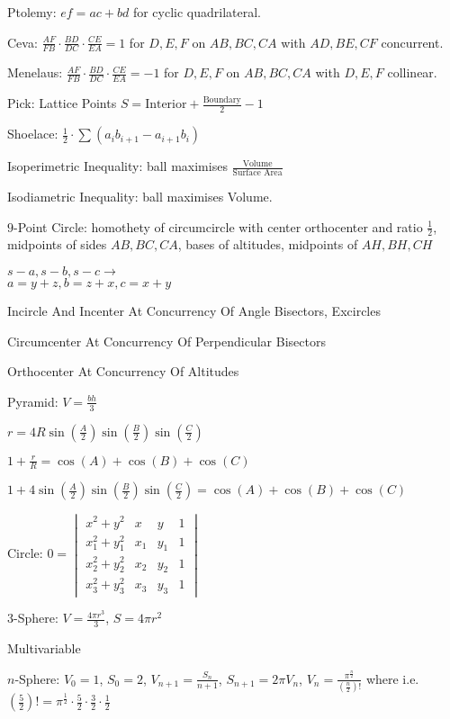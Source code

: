 Ptolemy: $ef=ac+bd$ for cyclic quadrilateral.

Ceva: $\frac{AF}{FB} \cdot \frac{BD}{DC} \cdot \frac{CE}{EA} = 1$ for $D,E,F$ on $AB,BC,CA$ with $AD,BE,CF$ concurrent.

Menelaus: $\frac{AF}{FB} \cdot \frac{BD}{DC} \cdot \frac{CE}{EA} = -1$ for $D,E,F$ on $AB,BC,CA$ with $D,E,F$ collinear.

Pick: Lattice Points $S=\text{Interior}+\frac{\text{Boundary}}{2}-1$

Shoelace: $\frac{1}{2} \cdot \sum (a_i b_{i+1} - a_{i+1} b_i)$

Isoperimetric Inequality: ball maximises $\frac{\text{Volume}}{\text{Surface Area}}$

Isodiametric Inequality: ball maximises Volume.

$9$-Point Circle: homothety of circumcircle with center orthocenter and ratio $\frac{1}{2}$, midpoints of sides $AB,BC,CA$, bases of altitudes, midpoints of $AH,BH,CH$

$s-a,s-b,s-c \to$ \\
$a=y+z,b=z+x,c=x+y$

Incircle And Incenter At Concurrency Of Angle Bisectors, Excircles

Circumcenter At Concurrency Of Perpendicular Bisectors

Orthocenter At Concurrency Of Altitudes

Pyramid: $V=\frac{bh}{3}$

$r=4R \sin \left( \frac{A}{2} \right) \sin \left( \frac{B}{2} \right) \sin \left( \frac{C}{2} \right)$

$1+\frac{r}{R}=\cos(A)+\cos(B)+\cos(C)$

$1+4 \sin \left( \frac{A}{2} \right) \sin \left( \frac{B}{2} \right) \sin \left( \frac{C}{2} \right)=\cos(A)+\cos(B)+\cos(C)$

Circle:
$0 =
\begin{vmatrix}
x^2+y^2 & x & y & 1 \\
x_1^2+y_1^2 & x_1 & y_1 & 1 \\
x_2^2+y_2^2 & x_2 & y_2 & 1 \\
x_3^2+y_3^2 & x_3 & y_3 & 1
\end{vmatrix}
$

$3$-Sphere: $V=\frac{4\pi r^3}{3}$, $S=4\pi r^2$

Multivariable

$n$-Sphere: $V_0 = 1$, $S_0 = 2$, $V_{n+1} = \frac{S_n}{n+1}$, $S_{n+1}=2 \pi V_n$, $V_n = \frac{\pi^{\frac{n}{2}}}{\left(\frac{n}{2} \right)!}$ where i.e. $\left(\frac{5}{2} \right)!=\pi^{\frac{1}{2}} \cdot \frac{5}{2} \cdot \frac{3}{2} \cdot \frac{1}{2}$

